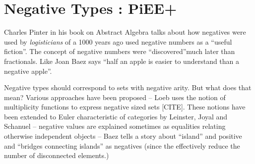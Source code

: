 \documentclass[preprint]{sigplanconf}
\begin{document}

\section{Negative Types : {{PiEE+}} }

Charles Pinter in his book on Abstract Algebra talks about how
negatives were used by \emph{logisticians} of a 1000 years ago used
negative numbers as a ``useful fiction''.  The concept of negative
numbers were ``discovered''much later than fractionals. Like Joan Baez
says ``half an apple is easier to understand than a negative apple''.

Negative types should correspond to sets with negative arity. But what
does that mean? Various approaches have been proposed -- Loeb uses the
notion of multiplicity functions to express negative sized sets
[CITE]. These notions have been extended to Euler characteristic of
categories by Leinster, Joyal and Schanuel -- negative values are
explained sometimes as equalities relating otherwise independent
objects -- Baez tells a story about ``island'' and positive and
``bridges connecting islands'' as negatives (since the effectively
reduce the number of disconnected elements.)
\end{document}
